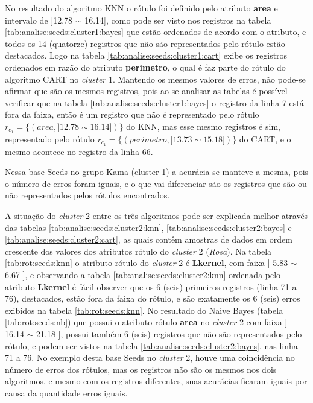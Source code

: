 \begin{table}[!ht]
    
 \label{tab:analise:seeds:cluster1}
\end{table}


No resultado do algoritmo KNN o rótulo foi definido pelo atributo \textbf{area} e intervalo de ]12.78 $\sim$ 16.14], como pode ser visto nos registros na tabela \ref{tab:analise:seeds:cluster1:bayes} que estão ordenados de acordo com o atributo, e todos os 14 (quatorze) registros que não são representados pelo rótulo estão destacados. Logo na tabela \ref{tab:analise:seeds:cluster1:cart} exibe os registros ordenados em razão do atributo \textbf{perimetro}, o qual é faz parte do rótulo do algoritmo CART no \textit{cluster} 1. Mantendo os mesmos valores de erros, não pode-se afirmar que são os mesmos registros, pois ao se analisar as tabelas é possível verificar que na tabela \ref{tab:analise:seeds:cluster1:bayes} o registro da linha 7 está fora da faixa, então é um registro que não é representado pelo rótulo ${r_{c_1}=\{ (area, ]12.78 \sim 16.14]) \} }$ do KNN, mas esse mesmo registros é sim, representado pelo rótulo ${r_{c_1}=\{ (perimetro, ]13.73 \sim 15.18]) \} }$ do CART, e o mesmo acontece no registro da linha 66. 

Nessa base Seeds no grupo Kama (cluster 1) a acurácia se manteve a mesma, pois o número de erros foram iguais, e o que vai diferenciar são os registros que são ou não representados pelos rótulos encontrados.
\newpage

A situação do \textit{cluster} 2 entre os três algoritmos pode ser explicada melhor através das tabelas \ref{tab:analise:seeds:cluster2:knn}, \ref{tab:analise:seeds:cluster2:bayes} e \ref{tab:analise:seeds:cluster2:cart}, as quais contêm amostras de dados em ordem crescente dos valores dos atributos rótulo  do \textit{cluster} 2 (\textit{Rosa}). Na tabela \ref{tab:rot:seeds:knn} o atributo rótulo do \textit{cluster} 2 é \textbf{Lkernel}, com faixa ] 5.83 $\sim$ 6.67 ], e observando a tabela \ref{tab:analise:seeds:cluster2:knn} ordenada pelo atributo \textbf{Lkernel} é fácil observer que os 6 (seis) primeiros registros (linha 71 a 76), destacados, estão fora da faixa do rótulo, e são exatamente os 6 (seis) erros exibidos na tabela \ref{tab:rot:seeds:knn}.
No resultado do Naive Bayes (tabela \ref{tab:rot:seeds:nb}) que possui o atributo rótulo \textbf{area} no \textit{cluster} 2 com faixa ] 16.14 $\sim$  21.18 ], possui também 6 (seis) registros que não são representados pelo rótulo, e podem ser vistos na tabela \ref{tab:analise:seeds:cluster2:bayes}, nas linha 71 a 76. No exemplo desta base Seeds no \textit{cluster} 2, houve uma coincidência no número de erros dos rótulos, mas os registros não são os mesmos nos dois algoritmos, e mesmo com os registros diferentes, suas acurácias ficaram iguais por causa da quantidade erros iguais.

